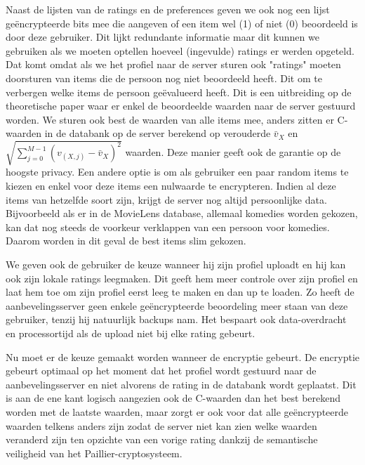 Naast de lijsten van de ratings en de preferences geven we ook nog een lijst ge\"encrypteerde bits mee die aangeven of een item wel (1) of niet (0) beoordeeld is door deze gebruiker. Dit lijkt redundante informatie maar dit kunnen we gebruiken als we moeten optellen hoeveel (ingevulde) ratings er werden opgeteld.  Dat komt omdat als we het profiel naar de server sturen ook "ratings" moeten doorsturen van items die de persoon nog niet beoordeeld heeft. Dit om te verbergen welke items de persoon ge\"evalueerd heeft. Dit is een uitbreiding op de theoretische paper \cite{ZErkinDyn} waar er enkel de beoordeelde waarden naar de server gestuurd worden. We sturen ook best de waarden van alle items mee, anders zitten er C-waarden in de databank op de server berekend op verouderde $\bar{v}_X$ en $\sqrt{\sum_{j=0}^{M-1} (v_{(X,j)} - \bar{v}_X)^2}$ waarden. Deze manier geeft ook de garantie op de hoogste privacy. Een andere optie is om als gebruiker een paar random items te kiezen en enkel voor deze items een nulwaarde te encrypteren. Indien al deze items van hetzelfde soort zijn, krijgt de server nog altijd persoonlijke data. Bijvoorbeeld als er in de MovieLens database, allemaal komedies worden gekozen, kan dat nog steeds de voorkeur verklappen van een persoon voor komedies. Daarom worden in dit geval de best items slim gekozen.

We geven ook de gebruiker de keuze wanneer hij zijn profiel uploadt en hij kan ook zijn lokale ratings leegmaken. Dit geeft hem meer controle over zijn profiel en laat hem toe om zijn profiel eerst leeg te maken en dan up te loaden. Zo heeft de aanbevelingsserver geen enkele ge\"encrypteerde beoordeling meer staan van deze gebruiker, tenzij hij natuurlijk backups nam. Het bespaart ook data-overdracht en processortijd als de upload niet bij elke rating gebeurt.

Nu moet er de keuze gemaakt worden wanneer de encryptie gebeurt. De encryptie gebeurt optimaal op het moment dat het profiel wordt gestuurd naar de aanbevelingsserver en niet alvorens de rating in de databank wordt geplaatst. Dit is aan de ene kant logisch aangezien ook de C-waarden dan het best berekend worden met de laatste waarden, maar zorgt er ook voor dat alle ge\"encrypteerde waarden telkens anders zijn zodat de server niet kan zien welke waarden veranderd zijn ten opzichte van een vorige rating dankzij de semantische veiligheid van het Paillier-cryptosysteem.